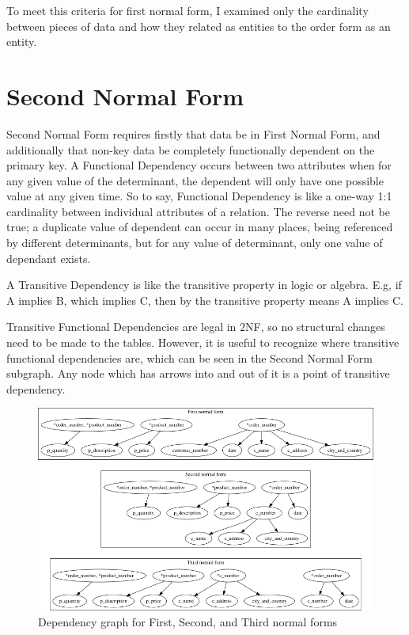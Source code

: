 \documentclass{article}
\begin{document}
To meet this criteria for first normal form, I examined only the
cardinality between pieces of data and how they related as entities to
the order form as an entity.

\section{Second Normal Form}

Second Normal Form requires firstly that data be in First Normal Form,
and additionally that non-key data be completely functionally dependent
on the primary key. A Functional Dependency occurs between two
attributes when for any given value of the determinant, the dependent
will only have one possible value at any given time. So to say,
Functional Dependency is like a one-way 1:1 cardinality between
individual attributes of a relation. The reverse need not be true; a
duplicate value of dependent can occur in many places, being referenced
by different determinants, but for any value of determinant, only one
value of dependant exists.

A Transitive Dependency is like the transitive property in logic or
algebra. E.g, if A implies B, which implies C, then by the transitive
property means A implies C.

Transitive Functional Dependencies are legal in 2NF, so no structural
changes need to be made to the tables. However, it is useful to
recognize where transitive functional dependencies are, which can be
seen in the Second Normal Form subgraph. Any node which has arrows into
and out of it is a point of transitive dependency.

\begin{figure}
	\centering
	\includegraphics[width=\textwidth]{Ex04-Normalization-Stewart_Johnston.png}
	\caption{Dependency graph for First, Second, and Third normal
	forms}
\end{figure}
\end{document}
